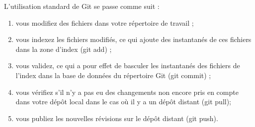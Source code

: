 L'utilisation standard de Git se passe comme suit :
\begin{enumerate}
	\item vous modifiez des fichiers dans votre répertoire de travail ;
	\item vous indexez les fichiers modifiés, ce qui ajoute des instantanés de ces fichiers dans la zone d'index (git add) ;
	\item vous validez, ce qui a pour effet de basculer les instantanés des fichiers de l'index dans la base de données du répertoire Git (git commit) ;
	\item vous vérifiez s'il n'y a pas eu des changements non encore pris en compte dans votre dépôt local dans le cas où il y a un dépôt distant (git pull);
	\item vous publiez les nouvelles révisions sur le dépôt distant (git push).
\end{enumerate}
